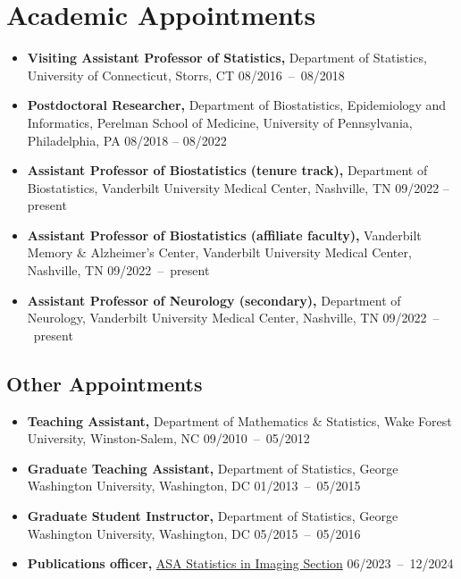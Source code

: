 \documentclass[12pt]{article}
\begin{document}
	\section*{Academic Appointments}
	\begin{itemize}
		\item {\bf Visiting Assistant Professor of Statistics,} 
		Department of Statistics, University of Connecticut, Storrs, 
		CT \hfill \mbox{08/2016 -- 08/2018} 
		\item {\bf Postdoctoral Researcher,} Department of 
		Biostatistics, Epidemiology and Informatics, Perelman School of Medicine, University of Pennsylvania, Philadelphia, PA \hfill 08/2018 -- 08/2022
		\item {\bf Assistant Professor of Biostatistics (tenure track),} Department of Biostatistics, Vanderbilt University Medical Center, Nashville, TN \hfill 09/2022 -- present
		\item {\bf Assistant Professor of Biostatistics (affiliate faculty),} Vanderbilt Memory \& Alzheimer's Center, Vanderbilt University Medical Center, Nashville, TN \hfill \mbox{09/2022 -- present}
		\item {\bf Assistant Professor of Neurology (secondary),} 
		Department of Neurology, Vanderbilt University Medical 
		Center, Nashville, TN \hfill \mbox{09/2022 -- present}
	\end{itemize}

	\subsection*{Other Appointments}
	\begin{itemize}
		\item {\bf Teaching Assistant,} Department of Mathematics \& Statistics, Wake Forest University, Winston-Salem, NC \hfill \mbox{09/2010 -- 05/2012}
		\item {\bf Graduate Teaching Assistant,} Department of 
		Statistics, George Washington University, Washington, DC 
		\hfill \mbox{01/2013 -- 05/2015}
		\item {\bf Graduate Student Instructor,} Department of 
		Statistics, George Washington University, Washington, DC 
		\hfill \mbox{05/2015 -- 05/2016}
		\item {\bf Publications officer,} 
		\href{https://www.statsinimaging.org/}{ASA Statistics in 
		Imaging Section}
		\hfill \mbox{06/2023 -- 12/2024}
	\end{itemize}
\end{document}
